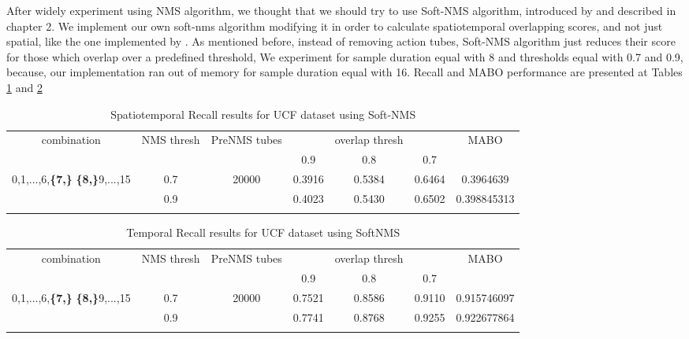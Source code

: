 After widely experiment using NMS algorithm, we thought that we should try to use Soft-NMS algorithm, introduced by \cite{DBLP:journals/corr/BodlaSCD17} and described in chapter 2. We implement our own soft-nms algorithm modifying it in order to calculate spatiotemporal overlapping
scores, and not just spatial, like the one implemented by \cite{DBLP:journals/corr/BodlaSCD17}. As mentioned before, instead of removing action tubes, Soft-NMS algorithm just reduces their score for those which overlap over a predefined threshold, We experiment for sample duration
equal with 8 and thresholds equal with 0.7 and 0.9, because, our implementation ran out of memory for sample duration equal with 16.
Recall and MABO performance are presented at Tables \ref{table:ucf_softnms_recall} and \ref{table:ucf_softnms_temp_recall}

\begin{center}
  \setlength{\tabcolsep}{2pt}
\begin{longtable}{||c | c | c | c c c| c|}

  \hline
  \multirow{2}{*}{combination} & \multirow{2}{2.5em}{NMS thresh} & \multirow{2}{3.5em}{PreNMS tubes} &  {} &overlap thresh & {} & \multirow{2}{*}{MABO} \\
  {} & {} & {} &  0.9 &  0.8 & 0.7 & {}\\         
  \hline
  \multirow{2}{7em}{0,1,...,6,\textbf{\{7,\}}
  \textbf{\{8,\}}9,...,15 }  & 0.7 &\multirow{2}{*}{20000}  & 0.3916 & 0.5384 & 0.6464 & 0.3964639 \\
  \cline{2-2} \cline{4-7} 
  {} &  0.9   & {}   & 0.4023 & 0.5430 & 0.6502 & 0.398845313 \\
  \hline                                    

  \caption{Spatiotemporal Recall results for UCF dataset using Soft-NMS}
  \label{table:ucf_softnms_recall}
\end{longtable} 
\end{center}

\begin{center}
  \setlength{\tabcolsep}{2.2pt}
\begin{longtable}{||c | c | c | c c c| c|}

  \hline
  \multirow{2}{*}{combination} & \multirow{2}{2.5em}{NMS thresh} & \multirow{2}{3.5em}{PreNMS tubes} &  {} &overlap thresh & {} & \multirow{2}{*}{MABO} \\
  {} & {} & {} &  0.9 &  0.8 & 0.7 & {}\\         
  \hline

  \multirow{2}{7em}{0,1,...,6,\textbf{\{7,\}}
    \textbf{\{8,\}}9,...,15 }  & 0.7 &\multirow{2}{*}{20000}  & 0.7521 & 0.8586 & 0.9110 & 0.915746097  \\
  \cline{2-2} \cline{4-7} 
  {} &  0.9   & {}   & 0.7741 & 0.8768 & 0.9255 & 0.922677864 \\
  \hline                                    

  \caption{Temporal Recall results for UCF dataset using SoftNMS}
  \label{table:ucf_softnms_temp_recall}
\end{longtable} 
\end{center}

